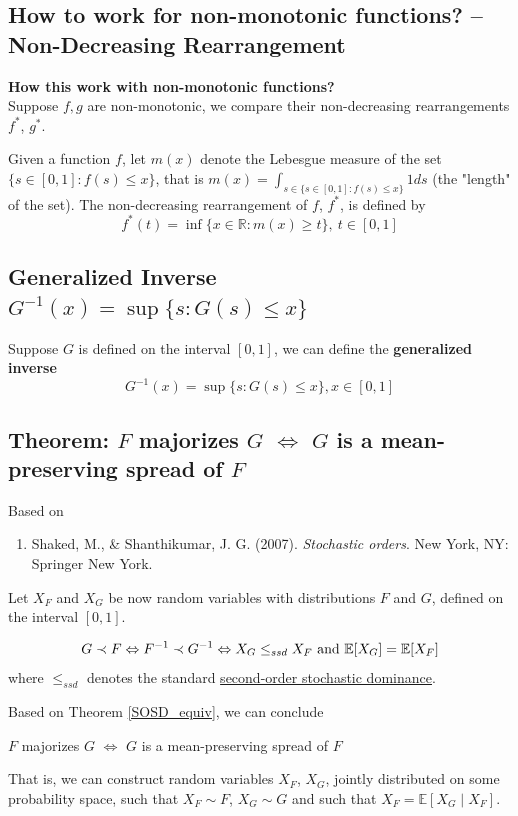 \documentclass[11pt]{elegantbook}
\begin{document}
\subsection{How to work for non-monotonic functions? -- Non-Decreasing Rearrangement}
\begin{note}
    \normalfont
    \textbf{How this work with non-monotonic functions?}\\
    Suppose $f,g$ are non-monotonic, we compare their non-decreasing rearrangements $f^*$, $g^*$.
    \begin{definition}[Rearrangement]
        \normalfont
        Given a function $f$, let $m(x)$ denote the Lebesgue measure of the set $\{s \in[0, 1]: f(s)\leq x\}$, that is $m(x)=\int_{s\in\{s \in[0, 1]: f(s)\leq x\}}1ds$ (the "length" of the set). The non-decreasing rearrangement of $f$, $f^*$, is defined by $$f^*(t) = \inf\{ x \in \mathbb{R}: m(x) \geq t\},\ t\in[0,1]$$
    \end{definition}
\end{note}

\subsection{Generalized Inverse $G^{-1}(x)=\sup\{s:G(s)\leq x\}$}
\begin{definition}
    \normalfont
    Suppose $G$ is defined on the interval $[0,1]$, we can define the \textbf{generalized inverse}
    $$G^{-1}(x)=\sup\{s:G(s)\leq x\}, x\in [0,1]$$
\end{definition}

\subsection{Theorem: $F$ majorizes $G$ $\Leftrightarrow$ $G$ is a mean-preserving spread of $F$}
Based on
\begin{enumerate}[$\circ$]
    \item Shaked, M., \& Shanthikumar, J. G. (2007). \textit{Stochastic orders}. New York, NY: Springer New York.
\end{enumerate}
Let $X_F$ and $X_G$ be now random variables with distributions $F$ and $G$, defined on the interval $[0,1]$.
\begin{theorem}
    $$G\prec F \Leftrightarrow F^{-1}\prec G^{-1} \Leftrightarrow X_{G}\leq_{ssd}X_F \textnormal{ and }\mathbb{E}[X_G]=\mathbb{E}[X_F]$$
    where $\leq_{ssd}$ denotes the standard \underline{second-order stochastic dominance}.
\end{theorem}
Based on Theorem \ref{SOSD_equiv}, we can conclude
\begin{corollary}
    \begin{center}
        $F$ majorizes $G$ $\Leftrightarrow$ $G$ is a mean-preserving spread of $F$
    \end{center}
\end{corollary}
That is, we can construct random variables $X_F$, $X_G$,
jointly distributed on some probability space, such that $X_F \sim F$, $X_G \sim G$ and such that $X_F = \mathbb{E}[X_G \mid X_F]$.
\end{document}

